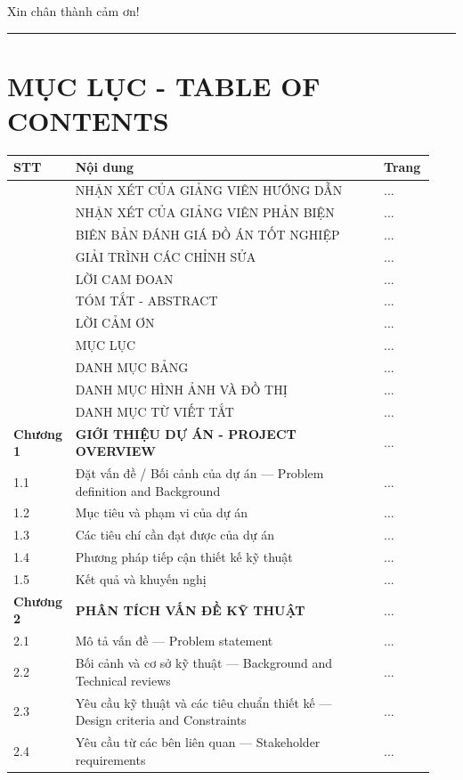 \documentclass[13pt,a4paper]{extarticle}
\newcounter{none} %
\newcommand{\thesislongtableorignewline}{}
\let\thesislongtableorignewline\\
\renewcommand{\\}{\thesislongtableorignewline\hline}%
\let\\\thesislongtableorignewline
\newcommand{\majorheading}[1]{\clearpage\section*{#1}}
\begin{document}
Xin chân thành cảm ơn!

\begin{center}\rule{0.5\linewidth}{0.5pt}\end{center}

\majorheading{MỤC LỤC - TABLE OF CONTENTS}\label{mux1ee5c-lux1ee5c---table-of-contents}

{\def\LTcaptype{none} %
\begin{longtable}{|C{0.10\linewidth}|L{0.72\linewidth}|C{0.12\linewidth}|}
\hline \textbf{} \textbf{STT} & \textbf{Nội dung} & \textbf{Trang} \\
\hline
\endhead
\hline
\endlastfoot
& NHẬN XÉT CỦA GIẢNG VIÊN HƯỚNG DẪN & ... \\
& NHẬN XÉT CỦA GIẢNG VIÊN PHẢN BIỆN & ... \\
& BIÊN BẢN ĐÁNH GIÁ ĐỒ ÁN TỐT NGHIỆP & ... \\
& GIẢI TRÌNH CÁC CHỈNH SỬA & ... \\
& LỜI CAM ĐOAN & ... \\
& TÓM TẮT - ABSTRACT & ... \\
& LỜI CẢM ƠN & ... \\
& MỤC LỤC & ... \\
& DANH MỤC BẢNG & ... \\
& DANH MỤC HÌNH ẢNH VÀ ĐỒ THỊ & ... \\
& DANH MỤC TỪ VIẾT TẮT & ... \\
\textbf{Chương 1} & \textbf{GIỚI THIỆU DỰ ÁN - PROJECT OVERVIEW} & ... \\
1.1 & Đặt vấn đề / Bối cảnh của dự án --- Problem definition and
Background & ... \\
1.2 & Mục tiêu và phạm vi của dự án & ... \\
1.3 & Các tiêu chí cần đạt được của dự án & ... \\
1.4 & Phương pháp tiếp cận thiết kế kỹ thuật & ... \\
1.5 & Kết quả và khuyến nghị & ... \\
\textbf{Chương 2} & \textbf{PHÂN TÍCH VẤN ĐỀ KỸ THUẬT} & ... \\
2.1 & Mô tả vấn đề --- Problem statement & ... \\
2.2 & Bối cảnh và cơ sở kỹ thuật --- Background and Technical reviews &
... \\
2.3 & Yêu cầu kỹ thuật và các tiêu chuẩn thiết kế --- Design criteria
and Constraints & ... \\
2.4 & Yêu cầu từ các bên liên quan --- Stakeholder requirements & ... \\

\end{longtable}}
\end{document}
